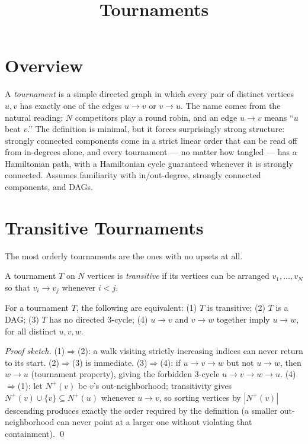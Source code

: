 \documentclass[11pt]{article}
\title{Tournaments}
\author{}
\date{}
\begin{document}
\thispagestyle{fancy}


\section{Overview}
A \emph{tournament} is a simple directed graph in which every pair of
distinct vertices $u, v$ has exactly one of the edges $u \to v$ or
$v \to u$. The name comes from the natural reading: $N$ competitors play a
round robin, and an edge $u \to v$ means ``$u$ beat $v$.'' The definition
is minimal, but it forces surprisingly strong structure: strongly
connected components come in a strict linear order that can be read off
from in-degrees alone, and every tournament --- no matter how tangled ---
has a Hamiltonian path, with a Hamiltonian cycle guaranteed whenever it is
strongly connected. Assumes familiarity with in/out-degree, strongly
connected components, and DAGs.

\section{Transitive Tournaments}
The most orderly tournaments are the ones with no upsets at all.

\begin{definitionbox}
A tournament $T$ on $N$ vertices is \emph{transitive} if its vertices can
be arranged $v_1, \ldots, v_N$ so that $v_i \to v_j$ whenever $i < j$.
\end{definitionbox}

\begin{theorembox}
For a tournament $T$, the following are equivalent: (1) $T$ is transitive;
(2) $T$ is a DAG; (3) $T$ has no directed $3$-cycle; (4) $u \to v$ and
$v \to w$ together imply $u \to w$, for all distinct $u, v, w$.

\emph{Proof sketch.} (1)$\Rightarrow$(2): a walk visiting strictly
increasing indices can never return to its start. (2)$\Rightarrow$(3) is
immediate. (3)$\Rightarrow$(4): if $u \to v \to w$ but not $u \to w$, then
$w \to u$ (tournament property), giving the forbidden $3$-cycle
$u\to v\to w\to u$. (4)$\Rightarrow$(1): let $N^+(v)$ be $v$'s
out-neighborhood; transitivity gives $N^+(v) \cup \{v\} \subseteq N^+(u)$
whenever $u \to v$, so sorting vertices by $|N^+(v)|$ descending produces
exactly the order required by the definition (a smaller out-neighborhood
can never point at a larger one without violating that containment). \qed
\end{theorembox}
\end{document}
